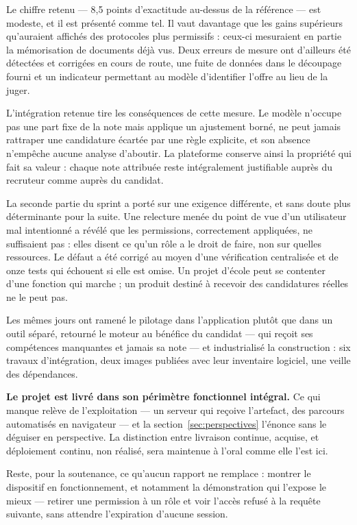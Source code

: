 \documentclass[11pt,a4paper]{article}
\begin{document}
Le chiffre retenu — 8,5 points d'exactitude au-dessus de la référence — est modeste, et il est présenté comme tel. Il vaut davantage que les gains supérieurs qu'auraient affichés des protocoles plus permissifs : ceux-ci mesuraient en partie la mémorisation de documents déjà vus. Deux erreurs de mesure ont d'ailleurs été détectées et corrigées en cours de route, une fuite de données dans le découpage fourni et un indicateur permettant au modèle d'identifier l'offre au lieu de la juger.

L'intégration retenue tire les conséquences de cette mesure. Le modèle n'occupe pas une part fixe de la note mais applique un ajustement borné, ne peut jamais rattraper une candidature écartée par une règle explicite, et son absence n'empêche aucune analyse d'aboutir. La plateforme conserve ainsi la propriété qui fait sa valeur : chaque note attribuée reste intégralement justifiable auprès du recruteur comme auprès du candidat.

\medskip
La seconde partie du sprint a porté sur une exigence différente, et sans doute plus déterminante pour la suite. Une relecture menée du point de vue d'un utilisateur mal intentionné a révélé que les permissions, correctement appliquées, ne suffisaient pas : elles disent ce qu'un rôle a le droit de faire, non sur quelles ressources. Le défaut a été corrigé au moyen d'une vérification centralisée et de onze tests qui échouent si elle est omise. Un projet d'école peut se contenter d'une fonction qui marche ; un produit destiné à recevoir des candidatures réelles ne le peut pas.

Les mêmes jours ont ramené le pilotage dans l'application plutôt que dans un outil séparé, retourné le moteur au bénéfice du candidat --- qui reçoit ses compétences manquantes et jamais sa note --- et industrialisé la construction : six travaux d'intégration, deux images publiées avec leur inventaire logiciel, une veille des dépendances.

\medskip
\noindent\textbf{Le projet est livré dans son périmètre fonctionnel intégral.} Ce qui manque relève de l'exploitation --- un serveur qui reçoive l'artefact, des parcours automatisés en navigateur --- et la section~\ref{sec:perspectives} l'énonce sans le déguiser en perspective. La distinction entre livraison continue, acquise, et déploiement continu, non réalisé, sera maintenue à l'oral comme elle l'est ici.

Reste, pour la soutenance, ce qu'aucun rapport ne remplace : montrer le dispositif en fonctionnement, et notamment la démonstration qui l'expose le mieux --- retirer une permission à un rôle et voir l'accès refusé à la requête suivante, sans attendre l'expiration d'aucune session.
\end{document}
